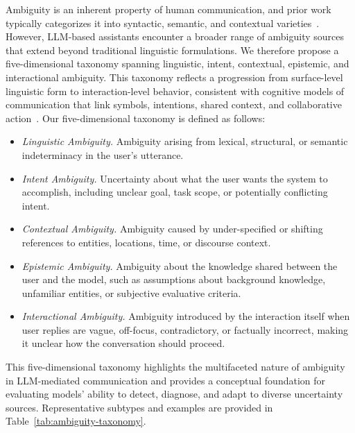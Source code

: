 \documentclass[sigconf]{acmart}
\begin{document}
Ambiguity is an inherent property of human communication, and prior work typically categorizes it into syntactic, semantic, and contextual varieties~\cite{zhang2024clamber}. However, LLM-based assistants encounter a broader range of ambiguity sources that extend beyond traditional linguistic formulations. We therefore propose a five-dimensional taxonomy spanning {linguistic}, {intent}, {contextual}, {epistemic}, and {interactional} ambiguity. This taxonomy reflects a progression from surface-level linguistic form to interaction-level behavior, consistent with cognitive models of communication that link symbols, intentions, shared context, and collaborative action~\cite{clark1992arenas,levinson2000presumptive}.
Our five-dimensional taxonomy is defined as follows:


\begin{itemize}[leftmargin=1.2em]

    \item \textit{Linguistic Ambiguity.}  
    Ambiguity arising from lexical, structural, or semantic indeterminacy in the user's utterance.

    \item \textit{Intent Ambiguity.}  
    Uncertainty about what the user wants the system to accomplish, including unclear goal, task scope, or potentially conflicting intent.

    \item \textit{Contextual Ambiguity.}  
    Ambiguity caused by under-specified or shifting references to entities, locations, time, or discourse context.

    \item \textit{Epistemic Ambiguity.}  
    Ambiguity about the knowledge shared between the user and the model, such as assumptions about background knowledge, unfamiliar entities, or subjective evaluative criteria.

    \item \textit{Interactional Ambiguity.}  
    Ambiguity introduced by the interaction itself when user replies are vague, off-focus, contradictory, or factually incorrect, making it unclear how the conversation should proceed.

\end{itemize}

This five-dimensional taxonomy highlights the multifaceted nature of ambiguity in LLM-mediated communication and provides a conceptual foundation for evaluating models' ability to detect, diagnose, and adapt to diverse uncertainty sources. Representative subtypes and examples are provided in Table~\ref{tab:ambiguity-taxonomy}.
\end{document}
